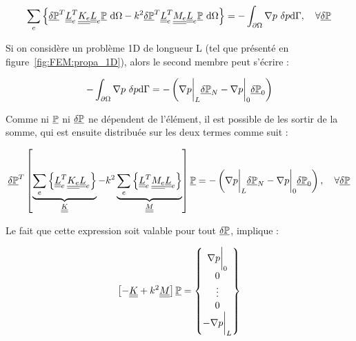 \begin{equation}
    \sum_e \left\{
	\GDP^T\uul{L}_e^T\uul{K_e}\uul{L}_e\GP~\dd\Omega - k^2 \GDP^T\uul{L}_e^T\uul{M_e}\uul{L}_e\GP~\dd\Omega \right\}
	= -\int_{\partial\Omega}\nabla p~\DP\dd\Gamma, \quad \forall\GDP\label{FEM1D:post_boolean}
\end{equation}


Si on considère un problème 1D de longueur L (tel que présenté en figure~\ref{fig:FEM:propa_1D}), alors le second membre
peut s'écrire :

$$-\int_{\partial\Omega}\nabla p~\DP\dd\Gamma = -\left(\nabla p\bigg|_L\GDP_N- \nabla p\bigg|_0\GDP_0\right)$$

Comme ni $\GP$ ni $\GDP$ ne dépendent de l'élément, il est possible de les sortir de la somme, qui est ensuite
distribuée sur les deux termes comme suit :

\begin{equation*}
	\GDP^T\left[\underbrace{\sum_e \left\{ \uul{L}_e^T\uul{K_e}\uul{L}_e\right\}}_{\uul{K}}
	- k^2 \underbrace{\sum_e\left\{\uul{L}_e^T\uul{M_e}\uul{L}_e\right\}}_{\uul{M}}\right]\GP
	= -\left(\nabla p\bigg|_L\GDP_N- \nabla p\bigg|_0\GDP_0\right), \quad \forall\GDP
\end{equation*}

Le fait que cette expression soit valable pour tout $\GDP$, implique :

\begin{equation}
\left[- \uul{K} + k^2\uul{M}\right]\GP = \begin{Bmatrix} \nabla p\bigg|_0\\0\\\vdots\\0\\-\nabla p\bigg|_L\end{Bmatrix} \label{FEM1D:final}
\end{equation}
